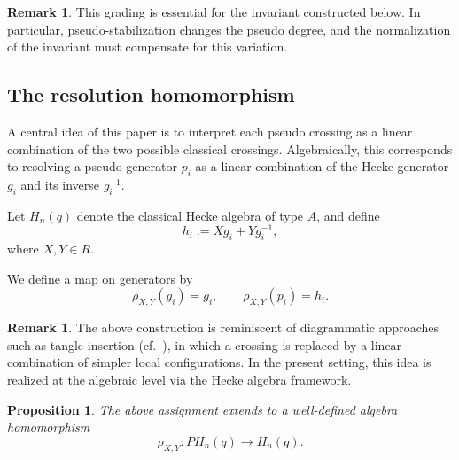 \documentclass[11pt]{article}
\numberwithin{equation}{section}
\newtheorem{proposition}[theorem]{Proposition}
\theoremstyle{definition}
\newtheorem{remark}[theorem]{Remark}
\begin{document}
\begin{remark}
This grading is essential for the invariant constructed below. In particular, pseudo-stabilization changes the pseudo degree, and the normalization of the invariant must compensate for this variation.
\end{remark}


\subsection{The resolution homomorphism}\label{subsection:reshom}

A central idea of this paper is to interpret each pseudo crossing as a linear combination of the two possible classical crossings. Algebraically, this corresponds to resolving a pseudo generator \(p_i\) as a linear combination of the Hecke generator \(g_i\) and its inverse \(g_i^{-1}\).

\medskip 

Let \(H_n(q)\) denote the classical Hecke algebra of type \(A\), and define
\[
h_i := Xg_i + Yg_i^{-1},
\]
where \(X,Y\in R\). 

We define a map on generators by
\[
\rho_{X,Y}(g_i)=g_i,
\qquad
\rho_{X,Y}(p_i)=h_i.
\]

\begin{remark}
The above construction is reminiscent of diagrammatic approaches such as tangle insertion (cf.\ \cite{HenrichKauffman2017}), in which a crossing is replaced by a linear combination of simpler local configurations. In the present setting, this idea is realized at the algebraic level via the Hecke algebra framework.
\end{remark}


\begin{proposition}
The above assignment extends to a well-defined algebra homomorphism
\[
\rho_{X,Y}:PH_n(q)\longrightarrow H_n(q).
\]
\end{proposition}
\end{document}

